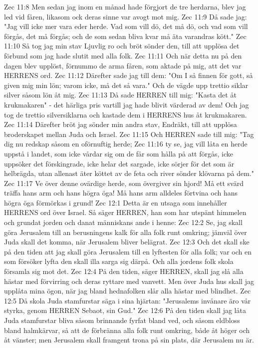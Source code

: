 Zec 11:8  Men sedan jag inom en månad hade förgjort de tre herdarna, blev jag led vid fåren, likasom ock deras sinne var avogt mot mig.
Zec 11:9  Då sade jag: "Jag vill icke mer vara eder herde. Vad som vill dö, det må dö, och vad som vill förgås, det må förgås; och de som sedan bliva kvar må äta varandras kött."
Zec 11:10  Så tog jag min stav Ljuvlig ro och bröt sönder den, till att upplösa det förbund som jag hade slutit med alla folk.
Zec 11:11  Och när detta nu på den dagen blev upplöst, förnummo de arma fåren, som aktade på mig, att det var HERRENS ord.
Zec 11:12  Därefter sade jag till dem: "Om I så finnen för gott, så given mig min lön; varom icke, må det så vara." Och de vägde upp trettio siklar silver såsom lön åt mig.
Zec 11:13  Då sade HERREN till mig: "Kasta det åt krukmakaren" - det härliga pris vartill jag hade blivit värderad av dem! Och jag tog de trettio silversiklarna och kastade dem i HERRENS hus åt krukmakaren.
Zec 11:14  Därefter bröt jag sönder min andra stav, Endräkt, till att upplösa broderskapet mellan Juda och Israel.
Zec 11:15  Och HERREN sade till mig: "Tag dig nu redskap såsom en oförnuftig herde;
Zec 11:16  ty se, jag vill låta en herde uppstå i landet, som icke vårdar sig om de får som hålla på att förgås, icke uppsöker det förskingrade, icke helar det sargade, icke sörjer för det som är helbrägda, utan allenast äter köttet av de feta och river sönder klövarna på dem."
Zec 11:17  Ve över denne ovärdige herde, som övergiver sin hjord! Må ett svärd träffa hans arm och hans högra öga! Må hans arm alldeles förtvina och hans högra öga förmörkas i grund!
Zec 12:1  Detta är en utsaga som innehåller HERRENS ord över Israel. Så säger HERREN, han som har utspänt himmelen och grundat jorden och danat människans ande i henne:
Zec 12:2  Se, jag skall göra Jerusalem till an berusningens kalk för alla folk runt omkring; jämväl över Juda skall det komma, när Jerusalem bliver belägrat.
Zec 12:3  Och det skall ske på den tiden att jag skall göra Jerusalem till en lyftesten för alla folk; var och en som försöker lyfta den skall illa sarga sig därpå. Och alla jordens folk skola församla sig mot det.
Zec 12:4  På den tiden, säger HERREN, skall jag slå alla hästar med förvirring och deras ryttare med vanvett. Men över Juda hus skall jag upplåta mina ögon, när jag bland hednafolken slår alla hästar med blindhet.
Zec 12:5  Då skola Juda stamfurstar säga i sina hjärtan: "Jerusalems invånare äro vår styrka, genom HERREN Sebaot, sin Gud."
Zec 12:6  På den tiden skall jag låta Juda stamfurstar bliva såsom brinnande fyrfat bland ved, och såsom eldbloss bland halmkärvar, så att de förbränna alla folk runt omkring, både åt höger och åt vänster; men Jerusalem skall framgent trona på sin plats, där Jerusalem nu är.
